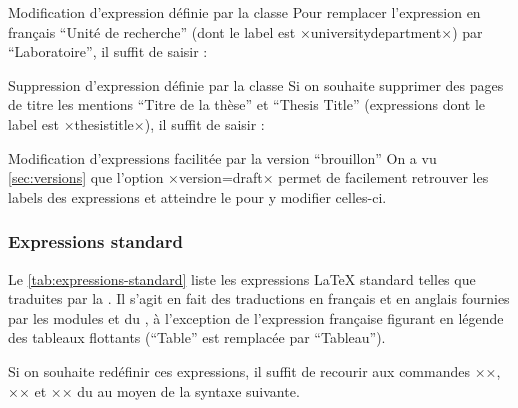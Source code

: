 \begin{dbexample}{Modification d'expression définie par la classe}{}
  Pour remplacer l'expression en français \enquote{Unit\'e de recherche} (dont le label est
  ×universitydepartment×) par \enquote{Laboratoire}, il suffit de
  saisir :
\begin{preamblecode}[title=Par exemple dans le \File{\configurationfile}]
\end{preamblecode}
\end{dbexample}
%
\begin{dbexample}{Suppression d'expression définie par la classe}{}
  Si on souhaite supprimer des pages de titre les mentions \enquote{Titre de la
    thèse} et \foreignquote{english}{Thesis Title} (expressions dont le label
  est ×thesistitle×), il suffit de saisir :
\begin{preamblecode}[title=Par exemple dans le \File{\configurationfile}]
\end{preamblecode}
\end{dbexample}

\begin{dbremark}{Modification d'expressions facilitée par la version
    \enquote{brouillon}}{}
  On a vu \vref{sec:versions} que l'option ×version=draft× permet de facilement
  retrouver les labels des expressions et atteindre le \File{\configurationfile}
  pour y modifier celles-ci.
\end{dbremark}

\subsubsection{Expressions standard}
\label{sec:expressions-standard}

Le \vref{tab:expressions-standard} liste les expressions \LaTeX{} standard
telles que traduites par la \yatcl{}. Il s'agit en fait des traductions en
français et en anglais fournies par les modules  et
 du , à l'exception de l'expression française
figurant en légende des tableaux flottants (\enquote{Table} est remplacée par
\enquote{Tableau}).%

Si on souhaite redéfinir ces expressions, il suffit de recourir aux commandes
×\addto×, ×\captionsfrench× et ×\captionsenglish× du  au moyen
de la syntaxe suivante.

